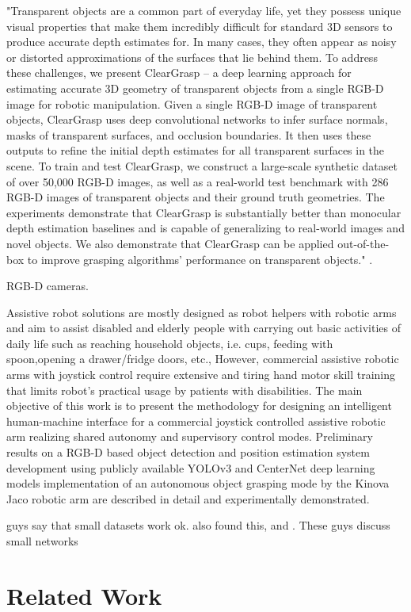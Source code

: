 "Transparent objects are a common part of everyday life, yet they possess unique visual properties that make them incredibly difficult for standard 3D sensors to produce accurate depth estimates for. In many cases, they often appear as noisy or distorted approximations of the surfaces that lie behind them. To address these challenges, we present ClearGrasp -- a deep learning approach for estimating accurate 3D geometry of transparent objects from a single RGB-D image for robotic manipulation. Given a single RGB-D image of transparent objects, ClearGrasp uses deep convolutional networks to infer surface normals, masks of transparent surfaces, and occlusion boundaries. It then uses these outputs to refine the initial depth estimates for all transparent surfaces in the scene. To train and test ClearGrasp, we construct a large-scale synthetic dataset of over 50,000 RGB-D images, as well as a real-world test benchmark with 286 RGB-D images of transparent objects and their ground truth geometries. The experiments demonstrate that ClearGrasp is substantially better than monocular depth estimation baselines and is capable of generalizing to real-world images and novel objects. We also demonstrate that ClearGrasp can be applied out-of-the-box to improve grasping algorithms' performance on transparent objects." \cite{sajjan2019cleargrasp}.

RGB-D cameras.

\cite{RakhimkulEtAl2019} Assistive robot solutions are mostly designed as robot helpers with robotic arms and aim to assist disabled and elderly people with carrying out basic activities of daily life such as reaching household objects, i.e. cups, feeding with spoon,opening a drawer/fridge doors, etc., However, commercial assistive robotic arms with joystick control require extensive and tiring hand motor skill training that limits robot’s practical usage by patients with disabilities. The main objective of this work is to present the methodology for designing an intelligent human-machine interface for a commercial joystick controlled assistive robotic arm realizing shared autonomy and supervisory control modes. Preliminary results on a RGB-D based object detection and position estimation system development using publicly available YOLOv3 and CenterNet deep learning models implementation of an autonomous object grasping mode by the Kinova Jaco robotic arm are described in detail and experimentally demonstrated.

\cite{batzner2021se3equivariant} guys say that small datasets work ok.\cite{power2021simple} also found this, and \cite{vu2021machine}. These guys \cite{frankle2019lottery} discuss small networks



\section{Related Work}
\label{context:related-work} 






